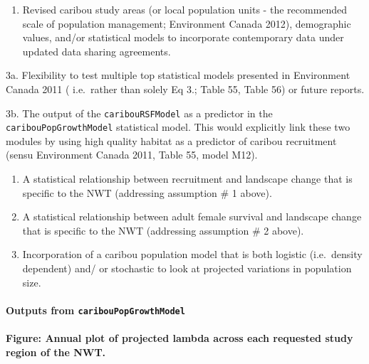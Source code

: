 \documentclass[]{article}
\providecommand{\tightlist}{%
  \setlength{\itemsep}{0pt}\setlength{\parskip}{0pt}}
\let\oldparagraph\paragraph
\renewcommand{\paragraph}[1]{\oldparagraph{#1}\mbox{}}
\begin{document}
\begin{enumerate}
\def\labelenumi{\arabic{enumi}.}
\setcounter{enumi}{1}
\tightlist
\item
  Revised caribou study areas (or local population units - the
  recommended scale of population management; Environment Canada 2012),
  demographic values, and/or statistical models to incorporate
  contemporary data under updated data sharing agreements.
\end{enumerate}

3a. Flexibility to test multiple top statistical models presented in
Environment Canada 2011 ( i.e.~rather than solely Eq 3.; Table 55, Table
56) or future reports.

3b. The output of the \texttt{caribouRSFModel} as a predictor in the
\texttt{caribouPopGrowthModel} statistical model. This would explicitly
link these two modules by using high quality habitat as a predictor of
caribou recruitment (sensu Environment Canada 2011, Table 55, model
M12).

\begin{enumerate}
\def\labelenumi{\arabic{enumi}.}
\setcounter{enumi}{3}
\item
  A statistical relationship between recruitment and landscape change
  that is specific to the NWT (addressing assumption \# 1 above).
\item
  A statistical relationship between adult female survival and landscape
  change that is specific to the NWT (addressing assumption \# 2 above).
\item
  Incorporation of a caribou population model that is both logistic
  (i.e.~density dependent) and/ or stochastic to look at projected
  variations in population size.
\end{enumerate}

\paragraph{\texorpdfstring{Outputs from
\texttt{caribouPopGrowthModel}}{Outputs from caribouPopGrowthModel}}\label{outputs-from-cariboupopgrowthmodel}

\paragraph{Figure: Annual plot of projected lambda across each requested
study region of the
NWT.}\label{figure-annual-plot-of-projected-lambda-across-each-requested-study-region-of-the-nwt.}
\end{document}
